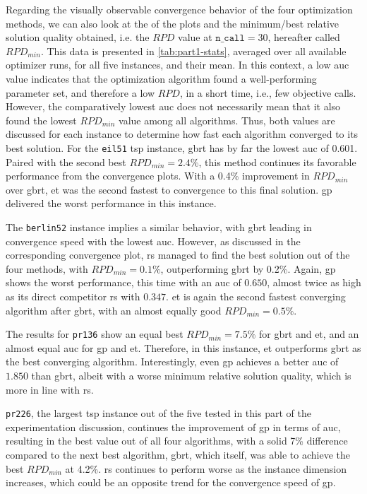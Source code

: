 Regarding the visually observable convergence behavior of the four optimization methods, we can also look at the  of the plots and the minimum/best relative solution quality obtained, i.e. the $RPD$ value at $\texttt{n\_call} = 30$, hereafter called $RPD_{min}$. This data is presented in \cref{tab:part1-stats}, averaged over all available optimizer runs, for all five instances, and their mean.
In this context, a low \gls{auc} value indicates that the optimization algorithm found a well-performing parameter set, and therefore a low $RPD$, in a short time, i.e., few objective calls. However, the comparatively lowest \gls{auc} does not necessarily mean that it also found the lowest $RPD_{min}$ value among all algorithms. Thus, both values are discussed for each instance to determine how fast each algorithm converged to its best solution. For the \texttt{eil51} \gls{tsp} instance, \gls{gbrt} has by far the lowest \gls{auc} of 0.601. Paired with the second best $RPD_{min} = 2.4\%$, this method continues its favorable performance from the convergence plots. With a 0.4\% improvement in $RPD_{min}$ over \gls{gbrt}, \gls{et} was the second fastest to convergence to this final solution. \gls{gp} delivered the worst performance in this instance.

The \texttt{berlin52} instance implies a similar behavior, with \gls{gbrt} leading in convergence speed with the lowest \gls{auc}. However, as discussed in the corresponding convergence plot, \gls{rs} managed to find the best solution out of the four methods, with $RPD_{min} = 0.1\%$, outperforming \gls{gbrt} by 0.2\%. Again, \gls{gp} shows the worst performance, this time with an \gls{auc} of $0.650$, almost twice as high as its direct competitor \gls{rs} with $0.347$. \gls{et} is again the second fastest converging algorithm after \gls{gbrt}, with an almost equally good $RPD_{min} = 0.5\%$.

The results for \texttt{pr136} show an equal best $RPD_{min} = 7.5\%$ for \gls{gbrt} and \gls{et}, and an almost equal \gls{auc} for \gls{gp} and \gls{et}. Therefore, in this instance, \gls{et} outperforms \gls{gbrt} as the best converging algorithm. Interestingly, even \gls{gp} achieves a better \gls{auc} of $1.850$ than \gls{gbrt}, albeit with a worse minimum relative solution quality, which is more in line with \gls{rs}.

\texttt{pr226}, the largest \gls{tsp} instance out of the five tested in this part of the experimentation discussion, continues the improvement of \gls{gp} in terms of \gls{auc}, resulting in the best value out of all four algorithms, with a solid 7\% difference compared to the next best algorithm, \gls{gbrt}, which itself, was able to achieve the best $RPD_{min}$ at 4.2\%. \gls{rs} continues to perform worse as the instance dimension increases, which could be an opposite trend for the convergence speed of \gls{gp}.

